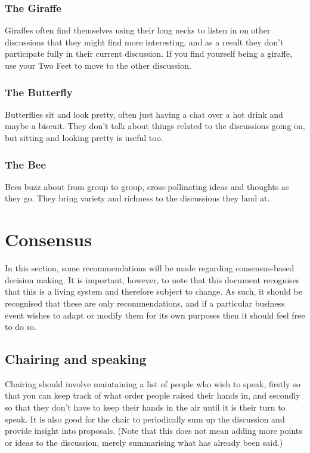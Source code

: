 \documentclass[a4paper, 12pt]{article} %
\begin{document}
\subsubsection{The Giraffe}
Giraffes often find themselves using their long necks to listen in on other discussions that they might find more interesting, and as a result they don't participate fully in their current discussion.  If you find yourself being a giraffe, use your Two Feet to move to the other discussion.

\subsubsection{The Butterfly}
Butterflies sit and look pretty, often just having a chat over a hot drink and maybe a biscuit.  They don't talk about things related to the discussions going on, but sitting and looking pretty is useful too.

\subsubsection{The Bee}
Bees buzz about from group to group, cross-pollinating ideas and thoughts as they go.  They bring variety and richness to the discussions they land at.

\section{Consensus}
\label{sec:consensus}
In this section, some recommendations will be made regarding consensus-based decision making.  It is important, however, to note that this document recognises that this is a living system and therefore subject to change.  As such, it should be recognised that these are only recommendations, and if a particular business event wishes to adapt or modify them for its own purposes then it should feel free to do so.

\subsection{Chairing and speaking}


Chairing should involve maintaining a list of people who wish to speak, firstly so that you can keep track of what order people raised their hands in, and secondly so that they don't have to keep their hands in the air until it is their turn to speak.  It is also good for the chair to periodically sum up the discussion and provide insight into proposals.  (Note that this does not mean adding more points or ideas to the discussion, merely summarising what has already been said.)
\end{document}
